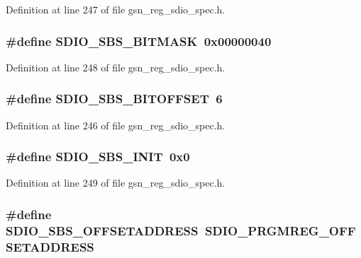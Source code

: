 Definition at line 247 of file gsn\_\-reg\_\-sdio\_\-spec.h.

\hypertarget{a00571_a5b70496c1b1393ecc443ddcccc86e6cd}{
\subsubsection[{SDIO\_\-SBS\_\-BITMASK}]{\setlength{\rightskip}{0pt plus 5cm}\#define SDIO\_\-SBS\_\-BITMASK~0x00000040}}
\label{a00571_a5b70496c1b1393ecc443ddcccc86e6cd}


Definition at line 248 of file gsn\_\-reg\_\-sdio\_\-spec.h.

\hypertarget{a00571_ab46ed01d39532bbb6207c81ffbd702cd}{
\subsubsection[{SDIO\_\-SBS\_\-BITOFFSET}]{\setlength{\rightskip}{0pt plus 5cm}\#define SDIO\_\-SBS\_\-BITOFFSET~6}}
\label{a00571_ab46ed01d39532bbb6207c81ffbd702cd}


Definition at line 246 of file gsn\_\-reg\_\-sdio\_\-spec.h.

\hypertarget{a00571_a932e3b494f835e01ac00b663afe35dfe}{
\subsubsection[{SDIO\_\-SBS\_\-INIT}]{\setlength{\rightskip}{0pt plus 5cm}\#define SDIO\_\-SBS\_\-INIT~0x0}}
\label{a00571_a932e3b494f835e01ac00b663afe35dfe}


Definition at line 249 of file gsn\_\-reg\_\-sdio\_\-spec.h.

\hypertarget{a00571_ae9485a368bdfdd8b921feffe1c83405e}{
\subsubsection[{SDIO\_\-SBS\_\-OFFSETADDRESS}]{\setlength{\rightskip}{0pt plus 5cm}\#define SDIO\_\-SBS\_\-OFFSETADDRESS~SDIO\_\-PRGMREG\_\-OFFSETADDRESS}}
\label{a00571_ae9485a368bdfdd8b921feffe1c83405e}


